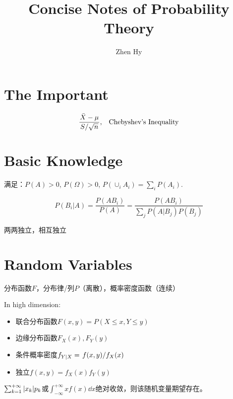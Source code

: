 \documentclass{article}
\begin{document}
\title{Concise Notes of Probability Theory}
\author{Zhen Hy}
\maketitle
\section{The Important}
\[
	\frac{\bar{X}-\mu}{\flatfrac{S}{\sqrt{n}}}
	\qq*{,}
	\mbox{Chebyshev's Inequality}
\] 

\section{Basic Knowledge}

\begin{defi}[概率, $P$]
	满足：$P(A)>0$, $P(\Omega)>0$, $P(\cup_iA_i)=\sum_iP(A_i)$.
\end{defi}

\begin{thm}[Bayes]
	\[
		P(B_i|A)=\frac{P(AB_i)}{P(A)}
		=
		\frac{P(AB_i)}{\sum_jP(A|B_j)P(B_j)}
	\] 
\end{thm}

\begin{defi}
	两两独立，相互独立
\end{defi}

\section{Random Variables}
\begin{defi}
    分布函数$F$，分布律/列$P$（离散），概率密度函数（连续）
\end{defi}

\begin{defi}
	In high dimension:
	\begin{itemize}
		\item 联合分布函数$F(x,y)=P(X\le x,Y\le y)$
		\item 边缘分布函数$F_X(x),F_Y(y)$
		\item 条件概率密度$f_{Y|X}=\flatfrac{f(x,y)}{f_X(x)}$
		\item 独立$f(x,y)=f_X(x)f_Y(y)$
	\end{itemize}
\end{defi}

\begin{defi}[Expectation期望]
	$\sum_{k=1}^{+\infty}\abs{x_k}p_k$或$\int_{-\infty}^{+\infty}xf(x)\dd x$绝对收敛，则该随机变量期望存在。
\end{defi}
\end{document}
